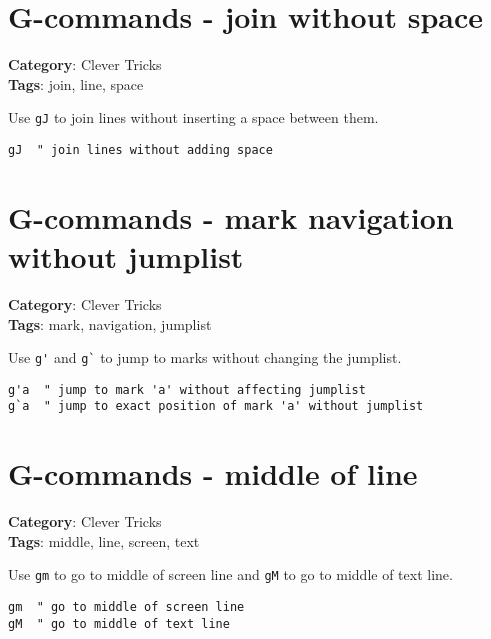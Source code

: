 {{\section{G-commands - join without space}

\textbf{Category}: Clever Tricks\\ \textbf{Tags}: join, line, space
\vspace{0.5cm}

Use {\footnotesize \Verb§gJ§} to join lines without inserting a space between them.

\begin{Exa*}{}
\begin{Verbatim}[fontsize=\footnotesize, breaklines, breakanywhere]
gJ  " join lines without adding space
\end{Verbatim}
\end{Exa*}

\section{G-commands - mark navigation without jumplist}

\textbf{Category}: Clever Tricks\\ \textbf{Tags}: mark, navigation, jumplist
\vspace{0.5cm}

Use {\footnotesize \Verb§g'§} and {\footnotesize \Verb§g`§} to jump to marks without changing the jumplist.

\begin{Exa*}{}
\begin{Verbatim}[fontsize=\footnotesize, breaklines, breakanywhere]
g'a  " jump to mark 'a' without affecting jumplist
g`a  " jump to exact position of mark 'a' without jumplist
\end{Verbatim}
\end{Exa*}

\section{G-commands - middle of line}

\textbf{Category}: Clever Tricks\\ \textbf{Tags}: middle, line, screen, text
\vspace{0.5cm}

Use {\footnotesize \Verb§gm§} to go to middle of screen line and {\footnotesize \Verb§gM§} to go to middle of text line.

\begin{Exa*}{}
\begin{Verbatim}[fontsize=\footnotesize, breaklines, breakanywhere]
gm  " go to middle of screen line
gM  " go to middle of text line
\end{Verbatim}
\end{Exa*}

}}
